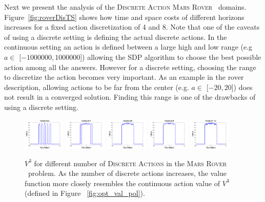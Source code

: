 \documentclass[twoside,11pt]{article}
\newcommand{\MarsRover}{\textsc{Mars Rover }}
\begin{document}
Next we present the analysis of the \textsc{Discrete Action} \MarsRover\ domains. Figure~\ref{fig:roverDisTS} shows how time and space costs of different horizons increases for a fixed action discretization of 4 and 8.
Note that one of the caveats of using a discrete setting is defining the actual discrete actions. In the continuous setting an action is defined between a large high and low range (e.g $a \in$ [$-1000000,1000000$]) allowing the SDP algorithm to choose the best possible action among all the answers. However for a discrete setting, choosing the range to discretize the action becomes very important. As an example in the rover description, allowing actions to be far from the center (e.g. $a \in$ [$-20,20$]) does not result in a converged solution. Finding this range is one of the drawbacks of using a discrete setting. 
\begin{figure}[tbp!]
\vspace{-2mm}
\centering
\includegraphics[width=0.18\textwidth]{pics/rover2.pdf}
\includegraphics[width=0.18\textwidth]{pics/rover4.pdf}
\includegraphics[width=0.18\textwidth]{pics/rover6.pdf}
\includegraphics[width=0.18\textwidth]{pics/rover8.pdf}
\includegraphics[width=0.18\textwidth]{pics/rover10.pdf}

\vspace{-2mm}
\caption{%
$V^3$ for different number of \textsc{Discrete Actions} in the \MarsRover\ problem. As the number of discrete actions increases, the value function more closely resembles the continuous action value of $V^3$ (defined in Figure ~\ref{fig:opt_val_pol}).
}
\label{fig:rover_discrete}
\vspace{-1mm}
\end{figure}
\end{document}
